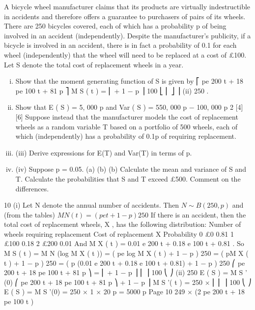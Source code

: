 \documentclass[a4paper,12pt]{article}
\begin{document}
\begin{enumerate}
A bicycle wheel manufacturer claims that its products are virtually indestructible in
accidents and therefore offers a guarantee to purchasers of pairs of its wheels. There
are 250 bicycles covered, each of which has a probability p of being involved in an
accident (independently). Despite the manufacturer’s publicity, if a bicycle is
involved in an accident, there is in fact a probability of 0.1 for each wheel
(independently) that the wheel will need to be replaced at a cost of £100. Let S denote
the total cost of replacement wheels in a year.

\begin{enumerate}[(i)]
\item Show that the moment generating function of S is given by
⎡ pe 200 t + 18 pe 100 t + 81 p
⎤
M S ( t ) = ⎢
+ 1 − p ⎥
100
⎣ ⎢
⎦ ⎥
(ii)
250
.
\item Show that E ( S ) = 5, 000 p and Var ( S ) = 550, 000 p − 100, 000 p 2
[4]
[6]
Suppose instead that the manufacturer models the cost of replacement wheels
as a random variable T based on a portfolio of 500 wheels, each of which
(independently) has a probability of 0.1p of requiring replacement.
\item (iii) Derive expressions for E(T) and Var(T) in terms of p.
\item (iv) Suppose p = 0.05.
(a)
(b)
(b)
Calculate the mean and variance of S and T.
Calculate the probabilities that S and T exceed £500.
Comment on the differences.
\end{enumerate}
10
(i)
Let N denote the annual number of accidents. Then $N \sim B (250, p )$ and (from the tables) $M N ( t ) = ( pe t + 1 − p ) 250$
If there is an accident, then the total cost of replacement wheels, X , has the following distribution:
Number of wheels requiring replacement
Cost of replacement X
Probability
0
£0
0.81
1
£100
0.18
2
£200
0.01
And M X ( t ) = 0.01 e 200 t + 0.18 e 100 t + 0.81 .
So
M S ( t ) = M N (log M X ( t ))
= ( pe log M X ( t ) + 1 − p ) 250
= ( pM X ( t ) + 1 − p ) 250
= ( p (0.01 e 200 t + 0.18 e 100 t + 0.81) + 1 − p ) 250
⎛ pe 200 t + 18 pe 100 t + 81 p
⎞
= ⎜
+ 1 − p ⎟
⎜
⎟
100
⎝
⎠
(ii)
250
E ( S ) = M S ' (0)
⎛ pe 200 t + 18 pe 100 t + 81 p
⎞
+ 1 − p ⎟
M S '( t ) = 250 × ⎜
⎜
⎟
100
⎝
⎠
E ( S ) = M S '(0) = 250 × 1 × 20 p = 5000 p
Page 10
249
× (2 pe 200 t + 18 pe 100 t )

\end{enumerate}
\end{document}
